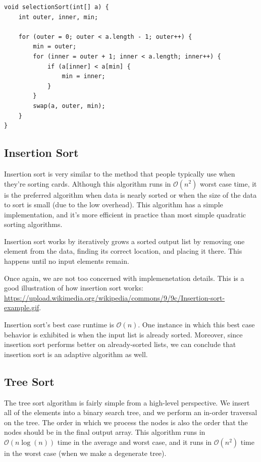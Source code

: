 \begin{lstlisting}
void selectionSort(int[] a) {
    int outer, inner, min;
    
    for (outer = 0; outer < a.length - 1; outer++) {
        min = outer;
        for (inner = outer + 1; inner < a.length; inner++) {
            if (a[inner] < a[min] {
                min = inner;
            }
        }
        swap(a, outer, min);
    }
}
\end{lstlisting}


\subsection{Insertion Sort}

Insertion sort is very similar to the method that people typically use when they're sorting cards. Although this algorithm runs in $\mathcal{O}(n^2)$ worst case time, it is the preferred algorithm when data is nearly sorted or when the size of the data to sort is small (due to the low overhead). This algorithm has a simple implementation, and it's more efficient in practice than most simple quadratic sorting algorithms. 

Insertion sort works by iteratively grows a sorted output list by removing one element from the data, finding its correct location, and placing it there. This happens until no input elements remain. 

Once again, we are not too concerned with implemenetation details. This is a good illustration of how insertion sort works:  \url{https://upload.wikimedia.org/wikipedia/commons/9/9c/Insertion-sort-example.gif}.

Insertion sort's best case runtime is $\mathcal{O}(n)$. One instance in which this best case behavior is exhibited is when the input list is already sorted. Moreover, since insertion sort performs better on already-sorted lists, we can conclude that insertion sort is an adaptive algorithm as well.


\subsection{Tree Sort}

The tree sort algorithm is fairly simple from a high-level perspective. We insert all of the elements into a binary search tree, and we perform an in-order traversal on the tree. The order in which we process the nodes is also the order that the nodes should be in the final output array. This algorithm runs in $\mathcal{O}(n\log(n))$ time in the average and worst case, and it runs in $\mathcal{O}(n^2)$ time in the worst case (when we make a degenerate tree).

